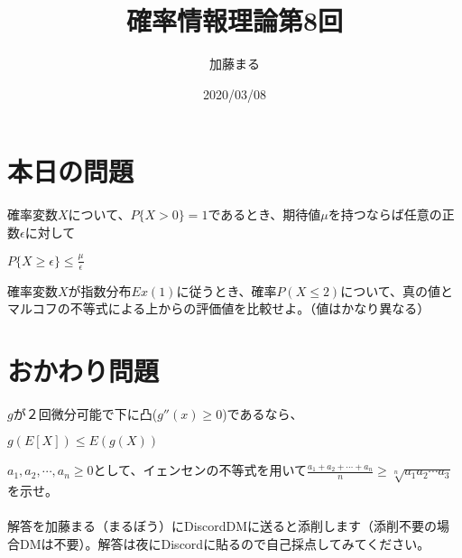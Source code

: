 \documentclass[a4j,uplatex,dvipdfmx]{jsarticle}
\title{確率情報理論第8回}
\author{加藤まる}
\date{2020/03/08}
\begin{document}
\maketitle

\section*{本日の問題}
\begin{tcolorbox}[
  title = マルコフの不等式,
  ]
    確率変数$X$について、$P\{ X>0 \}=1$であるとき、期待値$\mu$を持つならば任意の正数$\epsilon$に対して
    \begin{center}
      $P\{ X\ge \epsilon \} \le \frac{\mu}{\epsilon}$
    \end{center}
  \end{tcolorbox}
確率変数$X$が指数分布$Ex(1)$に従うとき、確率$P(X\le 2)$について、真の値とマルコフの不等式による上からの評価値を比較せよ。（値はかなり異なる）

\section*{おかわり問題}
  \begin{tcolorbox}[
  title = イェンセンの不等式,
  ]
      $g$が２回微分可能で下に凸($g''(x)\ge 0$)であるなら、
      \begin{center}
        $g(E[X])\le E(g(X))$
      \end{center}
  \end{tcolorbox}
$a_1,a_2,\cdots ,a_n \ge 0$として、イェンセンの不等式を用いて$\frac{a_1+a_2+\cdots +a_n}{n}\ge \sqrt[n]{a_1a_2\cdots a_3}$\\を示せ。
\\
\\
解答を加藤まる（まるぼう）にDiscordDMに送ると添削します（添削不要の場合DMは不要）。解答は夜にDiscordに貼るので自己採点してみてください。
\end{document}
